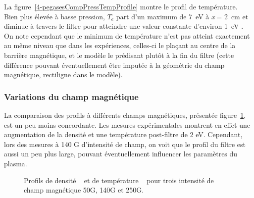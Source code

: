 \begin{refsection}
	La figure~\ref{4-pegasesCompPressTempProfile} montre le profil de température. Bien
	plus élevée à basse pression, $T_e$ part d'un maximum de 7~eV à $x\,$= 2~cm et
	diminue à travers le filtre pour atteindre une valeur constante d'environ 1~eV
. On note cependant que le minimum de température n'est pas atteint exactement
au même niveau que dans les expériences, celles-ci le plaçant au centre de la
barrière magnétique, et le modèle le prédisant plutôt à la fin du filtre (cette
différence pouvant éventuellement être imputée à la géométrie du champ
magnétique, rectiligne dans le modèle).

	\subsubsection{Variations du champ magnétique}
	
	La comparaison des profils à différents champs magnétiques, présentée
	figure~\ref{4-pegasesCompMagProfile}, est un peu moins concordante. Les mesures
	expérimentales montrent en effet une augmentation de la densité et une
	température post-filtre de 2 eV. Cependant, lors des mesures à 140 G
	d'intensité de champ, on voit que le profil du filtre est aussi un peu plus
	large, pouvant éventuellement influencer les paramètres du plasma.
	
\begin{figure}[!htbp]
  \centering
    \caption{Profils de densité ~ et de
    température ~ pour trois intensité de
    champ magnétique 50G, 140G et 250G.}
    \label{4-pegasesCompMagProfile}
\end{figure}


\end{refsection}
